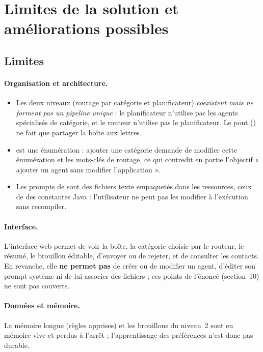 \section{Limites de la solution et améliorations possibles}
\label{sec:limites}

\subsection{Limites}

\paragraph{Organisation et architecture.}
\begin{itemize}
  \item Les deux niveaux (routage par catégorie et planificateur) \emph{coexistent mais ne forment pas un pipeline unique} : le planificateur n'utilise pas les agents spécialisés de catégorie, et le routeur n'utilise pas le planificateur. Le pont () ne fait que partager la boîte aux lettres.
  \item {} est une énumération : ajouter une catégorie demande de modifier cette énumération et les mots-clés de routage, ce qui contredit en partie l'objectif « ajouter un agent sans modifier l'application ».
  \item Les prompts de  sont des fichiers texte empaquetés dans les ressources, ceux de  des constantes Java : l'utilisateur ne peut pas les modifier à l'exécution sans recompiler.
\end{itemize}

\paragraph{Interface.}
L'interface web permet de voir la boîte, la catégorie choisie par le routeur, le résumé, le brouillon éditable, d'envoyer ou de rejeter, et de consulter les contacts. En revanche, elle \textbf{ne permet pas} de créer ou de modifier un agent, d'éditer son prompt système ni de lui associer des fichiers ; ces points de l'énoncé (section~10) ne sont pas couverts.

\paragraph{Données et mémoire.}
La mémoire longue (règles apprises) et les brouillons du niveau~2 sont en mémoire vive et perdus à l'arrêt ; l'apprentissage des préférences n'est donc pas durable.

